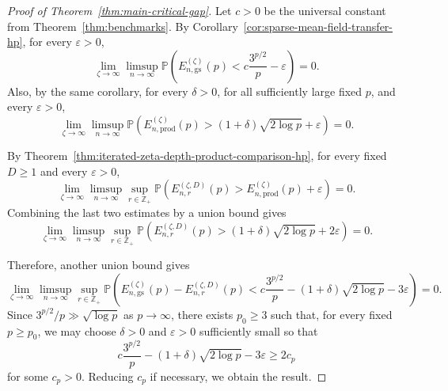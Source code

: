 \documentclass[12pt]{article}
\renewcommand{\P}{\mathbb{P}}
\begin{document}
\begin{proof}[Proof of Theorem~\ref{thm:main-critical-gap}]
Let \(c>0\) be the universal constant from Theorem~\ref{thm:benchmarks}. By
Corollary~\ref{cor:sparse-mean-field-transfer-hp}, for every \(\varepsilon>0\),
\[
\lim_{\zeta\to\infty}
\limsup_{n\to\infty}
\P\left(
    E_{n,\mathrm{gs}}^{(\zeta)}(p)
    <
    c\frac{3^{p/2}}{p}-\varepsilon
\right)
=0.
\]
Also, by the same corollary, for every \(\delta>0\), for all sufficiently
large fixed $p$, and every \(\varepsilon>0\),
\[
\lim_{\zeta\to\infty}
\limsup_{n\to\infty}
\P(
    E_{n,\mathrm{prod}}^{(\zeta)}(p)
    >
    (1+\delta)\sqrt{2\log p}+\varepsilon
)
=0.
\]

By Theorem~\ref{thm:iterated-zeta-depth-product-comparison-hp}, for every
fixed \(D\ge1\) and every \(\varepsilon>0\),
\[
\lim_{\zeta\to\infty}
\limsup_{n\to\infty}
\sup_{r\in\mathbb Z_+}
\P(
    E_{n,r}^{(\zeta,D)}(p)
    >
    E_{n,\mathrm{prod}}^{(\zeta)}(p)+\varepsilon)
=0.
\]
Combining the last two estimates by a union bound gives
\[
\lim_{\zeta\to\infty}
\limsup_{n\to\infty}
\sup_{r\in\mathbb Z_+}
\P(
    E_{n,r}^{(\zeta,D)}(p)
    >
    (1+\delta)\sqrt{2\log p}+2\varepsilon )
=0.
\]

Therefore, another union bound gives
\[
\lim_{\zeta\to\infty}
\limsup_{n\to\infty}
\sup_{r\in\mathbb Z_+}
\P\left(
    E_{n,\mathrm{gs}}^{(\zeta)}(p)
    -
    E_{n,r}^{(\zeta,D)}(p)
    <
    c\frac{3^{p/2}}{p}
    -
    (1+\delta)\sqrt{2\log p}
    -
    3\varepsilon
\right)
=0.
\]
Since $3^{p/2}/p\gg \sqrt{\log p}$ as $p\to\infty$, there exists \(p_0\ge3\) such that, for every fixed \(p\ge p_0\), we may
choose \(\delta>0\) and \(\varepsilon>0\) sufficiently small so that
\[
    c\frac{3^{p/2}}{p}
    -
    (1+\delta)\sqrt{2\log p}
    -
    3\varepsilon
    \ge
    2c_p
\]
for some \(c_p>0\). Reducing \(c_p\) if necessary, we obtain the result.
\end{proof}
\end{document}
